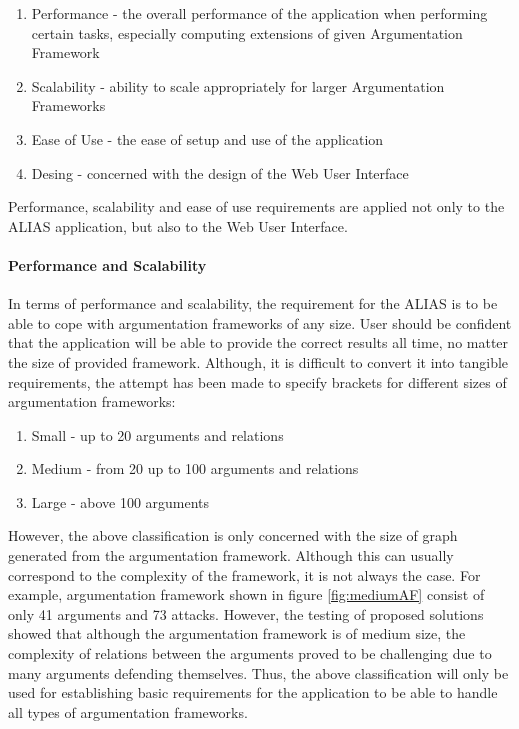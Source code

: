 \begin{enumerate}
	\item Performance - the overall performance of the application when performing certain tasks, especially computing extensions of given Argumentation Framework
	\item Scalability - ability to scale appropriately for larger Argumentation Frameworks
	\item Ease of Use - the ease of setup and use of the application 
	\item Desing - concerned with the design of the Web User Interface
\end{enumerate}

Performance, scalability and ease of use requirements are applied not only to the ALIAS application, but also to the Web User Interface. 

\paragraph{Performance and Scalability}

In terms of performance and scalability, the requirement for the ALIAS is to be able to cope with argumentation frameworks of any size. User should be confident that the application will be able to provide the correct results all time, no matter the size of provided framework. Although, it is difficult to convert it into tangible requirements, the attempt has been made to specify brackets for different sizes of argumentation frameworks: 

\begin{enumerate}
	\item Small - up to 20 arguments and relations
	\item Medium - from 20 up to 100 arguments and relations
	\item Large - above 100 arguments 
\end{enumerate}

However, the above classification is only concerned with the size of graph generated from the argumentation framework. Although this can usually correspond to the complexity of the framework, it is not always the case. For example, argumentation framework shown in figure \ref{fig:mediumAF} consist of only 41 arguments and 73 attacks. However, the testing of proposed solutions showed that although the argumentation framework is of medium size, the complexity of relations between the arguments proved to be challenging due to many arguments defending themselves. Thus, the above classification will only be used for establishing basic requirements for the application to be able to handle all types of argumentation frameworks. 

